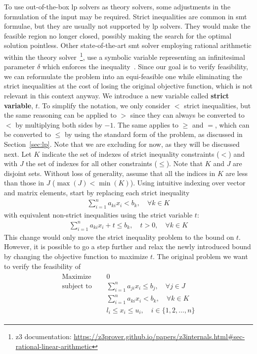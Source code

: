 \documentclass[runningheads]{llncs}
\begin{document}
To use out-of-the-box \gls{lp} solvers as theory solvers, some adjustments in the formulation of the input may be required.
Strict inequalities are common in \gls{smt} formulae, but they are usually not supported by \gls{lp} solvers.
They would make the feasible region no longer closed, possibly making the search for the optimal solution pointless.
Other state-of-the-art \gls{smt} solver employing rational arithmetic within the theory solver~\footnote{z3 documentation: \url{https://z3prover.github.io/papers/z3internals.html\#sec-rational-linear-arithmetic}}, use a symbolic variable representing an infinitesimal parameter $\delta$ which enforces the inequality~\cite{ref:lra-dpll-t}.
Since our goal is to verify feasibility, we can reformulate the problem into an equi-feasible one while eliminating the strict inequalities at the cost of losing the original objective function, which is not relevant in this context anyway.
We introduce a new variable called \textbf{strict variable}, $t$.
To simplify the notation, we only consider $<$ strict inequalities, but the same reasoning can be applied to $>$ since they can always be converted to $<$ by multiplying both sides by $-1$.
The same applies to $\ge$ and $=$, which can be converted to $\le$ by using the standard form of the problem, as discussed in Section~\ref{sec:lp}.
Note that we are excluding \nqcs for now, as they will be discussed next.
Let $K$ indicate the set of indexes of strict inequality constraints ($<$) and with $J$ the set of indexes for all other constraints ($\le$).
Note that $K$ and $J$ are disjoint sets.
Without loss of generality, assume that all the indices in $K$ are less than those in $J$ ($\max(J) < \min(K)$).
Using intuitive indexing over vector and matrix elements, start by replacing each strict inequality
\begin{align*}
    \sum_{i=1}^{n} a_{ki}x_{i} < b_k, \quad \forall k \in K
\end{align*}
with equivalent non-strict inequalities using the strict variable $t$:
\begin{align*}
    \sum_{i=1}^{n} a_{ki}x_{i} + t \le b_k, \quad t > 0, \quad \forall k \in K
\end{align*}
This change would only move the strict inequality problem to the bound on $t$.
However, it is possible to go a step further and relax the newly introduced bound by changing the objective function to maximize $t$.
The original problem we want to verify the feasibility of
\begin{align}
    \label{eq:lp-original}
    \begin{split}
        \text{Maximize }   \quad & 0                                                          \\
        \text{subject to } \quad & \sum_{i=1}^{n} a_{ji}x_{i} \le b_j,  \quad \forall j \in J \\
        \quad                    & \sum_{i=1}^{n} a_{ki}x_{i} < b_k,   \quad \forall k \in K  \\
        & l_i \le x_i \le u_i,  \quad i \in \{1, 2, \ldots, n\}
    \end{split}
\end{align}
\end{document}
